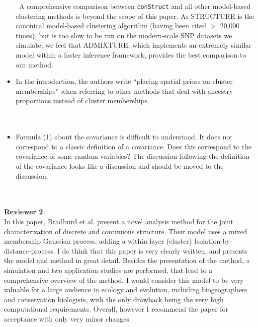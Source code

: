\documentclass[11pt]{letter}
\newcommand{\gb}[1]{{\bf\color{black}{#1}}}
\begin{document}
\begin{itemize}
{\ A comprehensive comparison between \texttt{conStruct} 
and all other model-based clustering methods is beyond the scope of this paper. 
As STRUCTURE is the canonical model-based clustering algorithm
(having been cited $>$ 20,000 times), but is too slow to be run 
on the modern-scale SNP datasets we simulate, 
we feel that ADMIXTURE, which implements an extremely similar model 
within a faster inference framework, 
provides the best comparison to our method.}\\

\item In the introduction, the authors write ``placing spatial priors on cluster memberships'' when referring to other methods that deal with ancestry proportions instead of cluster memberships.\\\\
\gb{We have edited our wording for clarity (see Lines XX-XX) in the revised manuscript.}\\

\item Formula (1) about the covariance is difficult to understand. It does not correspond to a classic definition of a covariance. Does this correspond to the covariance of some random variables? The discussion following the definition of the covariance looks like a discussion and should be moved to the discussion.\\\\

\gb{The definition given is a covariance of some random variables; we have made this fact more clear, 
and we have substantially rewritten the section on the allelic covariance
and have moved some of the intuition-building discussion to the Materials and Methods.
We have also moved some of this discussion to the Discussion (heading ``Allelic or genetic covariance?'').
}\\

\end{itemize}

\textbf{Reviewer 2}\\
In this paper, Bradburd et al. present a novel analysis method for the joint characterization of discrete and continuous structure. Their model uses a mixed membership Gaussian process, adding a within layer (cluster) Isolation-by-distance-process. I do think that this paper is very clearly written, and presents the model and method in great detail. Besides the presentation of the method, a simulation and two application studies are performed, that lead to a comprehensive overview of the method. I would consider this model to be very valuable for a large audience in ecology and evolution, including biogeographers and conservation biologists, with the only drawback being the very high computational requirements. Overall, however I recommend the paper for acceptance with only very minor changes.
\end{document}
